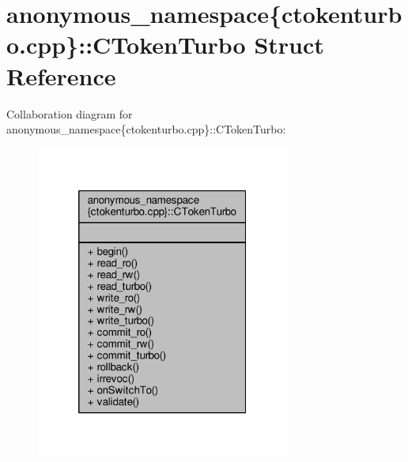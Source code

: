 \hypertarget{structanonymous__namespace_02ctokenturbo_8cpp_03_1_1CTokenTurbo}{\section{anonymous\-\_\-namespace\{ctokenturbo.\-cpp\}\-:\-:C\-Token\-Turbo Struct Reference}
\label{structanonymous__namespace_02ctokenturbo_8cpp_03_1_1CTokenTurbo}
}


Collaboration diagram for anonymous\-\_\-namespace\{ctokenturbo.\-cpp\}\-:\-:C\-Token\-Turbo\-:
\nopagebreak
\begin{figure}[H]
\begin{center}
\leavevmode
\includegraphics[width=236pt]{structanonymous__namespace_02ctokenturbo_8cpp_03_1_1CTokenTurbo__coll__graph}
\end{center}
\end{figure}

